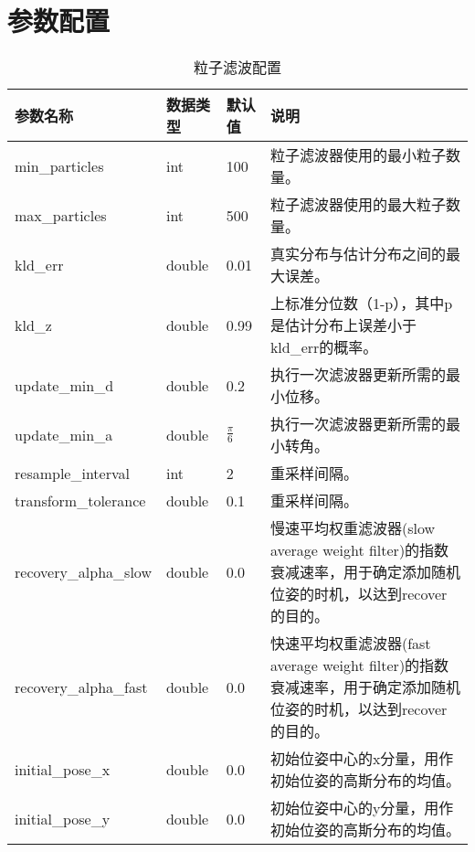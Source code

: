 



\section{参数配置}

\begin{table}[h]
  \caption{粒子滤波配置}  
  \begin{center}  
  \begin{tabular}{|l|l|l|p{8cm}|}  
  \hline  
  参数名称 & 数据类型 & 默认值 & 说明  \\ \hline  
  min\_particles & int & 100 & 粒子滤波器使用的最小粒子数量。 \\ \hline  
  max\_particles & int & 500 & 粒子滤波器使用的最大粒子数量。 \\  \hline  
  kld\_err & double & 0.01 & 真实分布与估计分布之间的最大误差。 \\  \hline  
  kld\_z & double & 0.99 & 上标准分位数（1-p），其中p是估计分布上误差小于kld\_err的概率。 \\  \hline  
  update\_min\_d & double & 0.2 & 执行一次滤波器更新所需的最小位移。 \\  \hline  
  update\_min\_a & double & $\frac{\pi}{6}$ & 执行一次滤波器更新所需的最小转角。 \\  \hline  
  resample\_interval & int & 2 & 重采样间隔。 \\  \hline  
  transform\_tolerance & double & 0.1 & 重采样间隔。 \\  \hline  
  recovery\_alpha\_slow & double & 0.0 & 慢速平均权重滤波器(slow average weight filter)的指数衰减速率，用于确定添加随机位姿的时机，以达到recover的目的。 \\  \hline  
  recovery\_alpha\_fast & double & 0.0 & 快速平均权重滤波器(fast average weight filter)的指数衰减速率，用于确定添加随机位姿的时机，以达到recover的目的。 \\  \hline  
  initial\_pose\_x & double & 0.0 & 初始位姿中心的x分量，用作初始位姿的高斯分布的均值。 \\  \hline  
  initial\_pose\_y & double & 0.0 & 初始位姿中心的y分量，用作初始位姿的高斯分布的均值。 \\  \hline  
  \end{tabular}  
  \end{center}  
  \end{table}  

